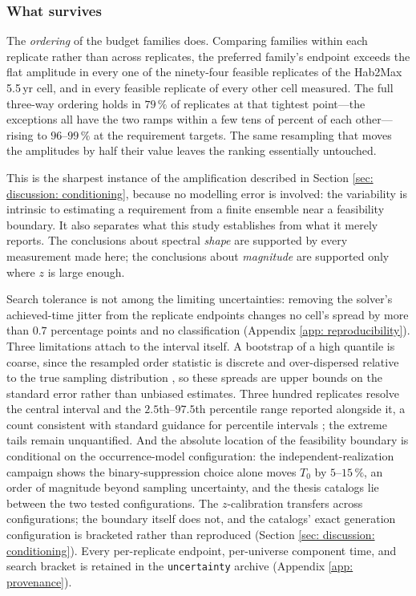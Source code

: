 \documentclass[12pt,a4paper]{article}
\numberwithin{equation}{section}
\numberwithin{figure}{section}
\numberwithin{table}{section}
\begin{document}
\subsubsection*{What survives}
The \emph{ordering} of the budget families does. Comparing families within each replicate rather than across replicates, the preferred family's endpoint exceeds the flat amplitude in every one of the ninety-four feasible replicates of the Hab2Max 5.5\,yr cell, and in every feasible replicate of every other cell measured. The full three-way ordering holds in $79\,\%$ of replicates at that tightest point---the exceptions all have the two ramps within a few tens of percent of each other---rising to $96$--$99\,\%$ at the requirement targets. The same resampling that moves the amplitudes by half their value leaves the ranking essentially untouched.

This is the sharpest instance of the amplification described in Section \ref{sec: discussion: conditioning}, because no modelling error is involved: the variability is intrinsic to estimating a requirement from a finite ensemble near a feasibility boundary. It also separates what this study establishes from what it merely reports. The conclusions about spectral \emph{shape} are supported by every measurement made here; the conclusions about \emph{magnitude} are supported only where $z$ is large enough.

Search tolerance is not among the limiting uncertainties: removing the solver's achieved-time jitter from the replicate endpoints changes no cell's spread by more than $0.7$ percentage points and no classification (Appendix \ref{app: reproducibility}). Three limitations attach to the interval itself. A bootstrap of a high quantile is coarse, since the resampled order statistic is discrete and over-dispersed relative to the true sampling distribution \cite{falkkaufmann1991}, so these spreads are upper bounds on the standard error rather than unbiased estimates. Three hundred replicates resolve the central interval and the $2.5$th--$97.5$th percentile range reported alongside it, a count consistent with standard guidance for percentile intervals \cite{andrewsbuchinsky2000, diciccio1996bootstrap}; the extreme tails remain unquantified. And the absolute location of the feasibility boundary is conditional on the occurrence-model configuration: the independent-realization campaign shows the binary-suppression choice alone moves $T_0$ by $5$--$15\,\%$, an order of magnitude beyond sampling uncertainty, and the thesis catalogs lie between the two tested configurations. The $z$-calibration transfers across configurations; the boundary itself does not, and the catalogs' exact generation configuration is bracketed rather than reproduced (Section \ref{sec: discussion: conditioning}). Every per-replicate endpoint, per-universe component time, and search bracket is retained in the \texttt{uncertainty} archive (Appendix \ref{app: provenance}).
\end{document}
